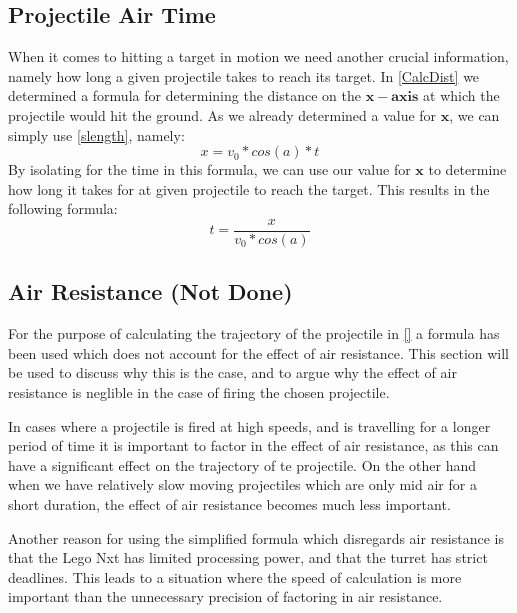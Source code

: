 \subsection{Projectile Air Time}
When it comes to hitting a target in motion we need another crucial information,
namely how long a given projectile takes to reach its target.
In \autoref{CalcDist} we determined a formula for determining the distance on
the $\mathbf{x-axis}$ at which the projectile would hit the ground. As we
already determined a value for $\mathbf{x}$, we can simply use
\autoref{slength}, namely:
\begin{equation}
x=v_0*cos(a)*t
\end{equation}
By isolating for the time in this formula, we can use our value for $\mathbf{x}$
to determine how long it takes for at given projectile to reach the target. This
results in the following formula:
\begin{equation}\label{TimeEq}
t=\frac{x}{v_0*cos(a)}
\end{equation}

\subsection{Air Resistance (Not Done)}\label{AirResDisc}
For the purpose of calculating the trajectory of the projectile in \autoref{} a
formula has been used which does not account for the effect of air resistance.
This section will be used to discuss why this is the case, and to argue why the
effect of air resistance is neglible in the case of firing the chosen
projectile.\nl

In cases where a projectile is fired at high speeds, and is travelling for a
longer period of time it is important to factor in the effect of air resistance,
as this can have a significant effect on the trajectory of te projectile. On the
other hand when we have relatively slow moving projectiles which are only mid
air for a short duration, the effect of air resistance becomes much less
important.\nl

Another reason for using the simplified formula which disregards air resistance
is that the Lego Nxt has limited processing power, and that the turret has
strict deadlines. This leads to a situation where the speed of calculation is
more important than the unnecessary precision of factoring in air resistance.



